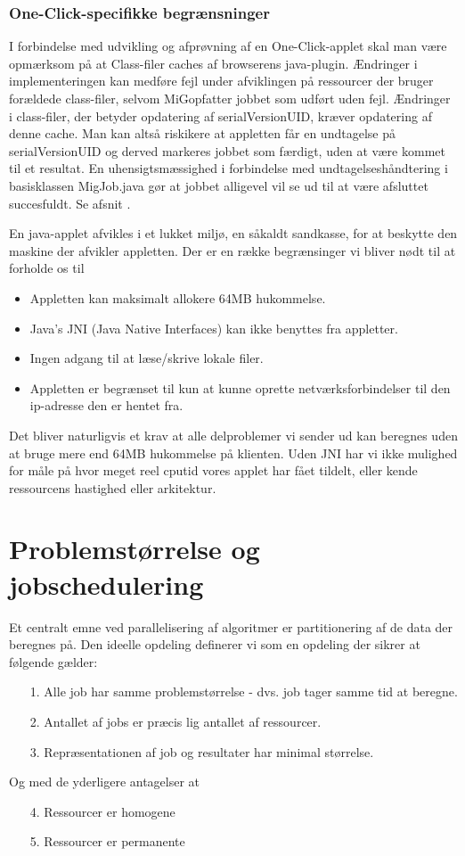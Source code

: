 \documentclass[pdf,draft,a4paper,11pt]{article}
\newcommand{\mig}{MiG}
\newcommand{\oc}{One-Click}
\begin{document}
\subsubsection{\oc-specifikke begrænsninger}

I forbindelse med udvikling og afprøvning af en \oc-applet skal man være opmærksom på at Class-filer caches af browserens java-plugin. Ændringer i implementeringen kan medføre fejl under afviklingen på ressourcer der bruger forældede class-filer, selvom \mig opfatter jobbet som udført uden fejl. Ændringer i class-filer, der betyder opdatering af serialVersionUID, kræver opdatering af denne cache. Man kan altså riskikere at appletten får en undtagelse på serialVersionUID og derved markeres jobbet som færdigt, uden at være kommet til et resultat. En uhensigtsmæssighed i forbindelse med undtagelseshåndtering i basisklassen MigJob.java gør at jobbet alligevel vil se ud til at være afsluttet succesfuldt. Se afsnit \cite{bugs}. 

En java-applet afvikles i et lukket miljø, en såkaldt sandkasse, for at beskytte den maskine der afvikler appletten. Der er en række begrænsinger vi bliver nødt til at forholde os til
\begin{itemize}
	\item Appletten kan maksimalt allokere 64MB hukommelse.
	\item Java's JNI (Java Native Interfaces) kan ikke benyttes fra appletter. 
	\item Ingen adgang til at læse/skrive lokale filer.
	\item Appletten er begrænset til kun at kunne oprette netværksforbindelser til den ip-adresse den er hentet fra.
\end{itemize}

Det bliver naturligvis et krav at alle delproblemer vi sender ud kan beregnes uden at bruge mere end 64MB hukommelse på klienten. Uden JNI har vi ikke mulighed for måle på hvor meget reel cputid vores applet har fået tildelt, eller kende ressourcens hastighed eller arkitektur.   


\section{Problemstørrelse og jobschedulering}
Et centralt emne ved parallelisering af algoritmer er partitionering af de data der beregnes på. Den ideelle opdeling definerer vi som en opdeling der sikrer at følgende gælder:
\begin{enumerate}
	\item[1.] Alle job har samme problemstørrelse - dvs. job tager samme tid at beregne.\label{beregningstid}
	\item[2.] Antallet af jobs er præcis lig antallet af ressourcer.\label{antal}
	\item[3.] Repræsentationen af job og resultater har minimal størrelse.\label{jobbeskrivelse}
\end{enumerate} 
Og med de yderligere antagelser at
\begin{enumerate}
	\item[4.] Ressourcer er homogene
	\item[5.] Ressourcer er permanente
\end{enumerate}
\end{document}
